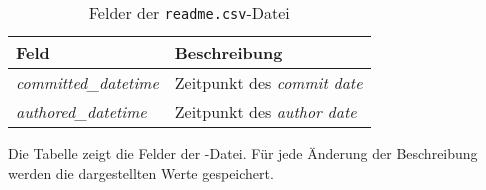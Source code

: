 \begin{table}
    \begin{tabularx}{\textwidth}{XL{10.2cm}}
        \toprule
        \textbf{Feld}              & \textbf{Beschreibung}            \\ \midrule
        \emph{committed\_datetime} & Zeitpunkt des \emph{commit date} \\
        \emph{authored\_datetime}  & Zeitpunkt des \emph{author date} \\
        \bottomrule
    \end{tabularx}
    \caption{Felder der \texttt{readme.csv}-Datei}
    \label{tab:readme}
    \small
    Die Tabelle zeigt die Felder der -Datei. Für jede Änderung der Beschreibung werden die dargestellten Werte gespeichert.
\end{table}
